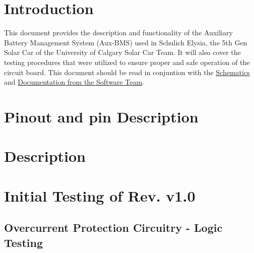 
\tableofcontents


\section{Introduction}
This document provides the description and functionality of the Auxiliary Battery Management System (Aux-BMS) used in Schulich Elysia, the 5th Gen Solar Car of the University of Calgary Solar Car Team. It will also cover the testing procedures that were utilized to ensure proper and safe operation of the circuit board. This document should be read in conjuntion with the \href{https://drive.google.com/drive/u/0/folders/1RuRFeXCH_df2QL6o7zRyYeLvdto-ttc6}{Schematics} and \href{https://github.com/UCSolarCarTeam/Epsilon-Embedded-Software/blob/master/Documentation/AuxBMS.adoc?fbclid=IwAR172uMpHtL8X5OH7NzIacaADQOfsAcYtxaQmT-veKxzl1v6rAvSl-hSCcg}{Documentation from the Software Team}.

\section{Pinout and pin Description}

\section{Description}

\section{Initial Testing of Rev. v1.0}

\subsection{Overcurrent Protection Circuitry - Logic Testing}

